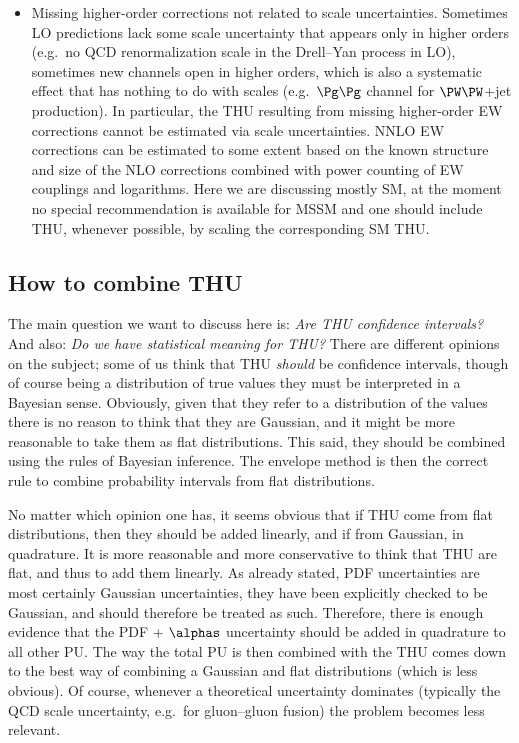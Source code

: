 \begin{itemize}
\item
Missing higher-order corrections not related to scale uncertainties.
Sometimes LO predictions lack some scale uncertainty 
that appears only in higher orders (e.g.\ no QCD renormalization scale in the
Drell--Yan process in LO),
sometimes new channels open in higher orders, which is also a systematic
effect that has nothing to do with scales 
(e.g.\ $\Pg\Pg$ channel for $\PW\PW$+jet production).
In particular, the THU resulting from missing higher-order EW corrections
cannot be estimated via scale uncertainties. NNLO EW corrections can be estimated 
to some extent based on the known structure and size of the NLO corrections 
combined with power counting of EW couplings and logarithms.
Here we are discussing mostly SM, at the moment no special recommendation is 
available for MSSM and one should include THU, whenever possible, by scaling the 
corresponding SM THU.
\end{itemize}
\subsection{How to combine THU}
The main question we want to discuss here is: {\em Are THU confidence intervals?} 
And also: {\em Do we have statistical meaning for THU?}
There are different opinions on the subject; some of us think that
THU {\em should} be confidence intervals, though of course being a distribution 
of true values they must be interpreted in a Bayesian sense. Obviously,
given that they refer to a distribution of the values there is no reason to think 
that they are Gaussian, and it might be more reasonable to take them as flat 
distributions. This said, they should be combined using the rules of Bayesian 
inference. The envelope method is then the correct rule to combine probability 
intervals from flat distributions.

No matter which opinion one has, it seems obvious that if THU come from flat 
distributions, then they should be added linearly, and if from Gaussian, in 
quadrature. It is more reasonable and more conservative to think that THU are 
flat, and thus to add them linearly. As already stated, PDF uncertainties are 
most certainly Gaussian uncertainties, they have been explicitly checked to be 
Gaussian, and should therefore be treated as such.
Therefore, there is enough evidence that the PDF + $\alphas$ uncertainty 
should be added in quadrature to all other PU. The way the total PU is then
combined with the THU comes down to the best way of combining a Gaussian and flat 
distributions (which is less obvious). Of course, whenever a
theoretical uncertainty dominates (typically the QCD
scale uncertainty, e.g.\ for gluon--gluon fusion) the problem becomes less
relevant.

